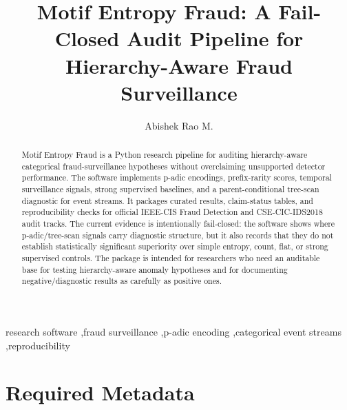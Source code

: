 \documentclass[preprint,12pt,a4paper]{elsarticle}
\begin{document}
\renewcommand{\labelenumii}{\arabic{enumi}.\arabic{enumii}}
\begin{frontmatter}

\title{Motif Entropy Fraud: A Fail-Closed Audit Pipeline for Hierarchy-Aware Fraud Surveillance}

\author{Abishek Rao M.}
\address{RV College of Engineering, Bengaluru, India}

\begin{abstract}
Motif Entropy Fraud is a Python research pipeline for auditing hierarchy-aware categorical fraud-surveillance hypotheses without overclaiming unsupported detector performance. The software implements p-adic encodings, prefix-rarity scores, temporal surveillance signals, strong supervised baselines, and a parent-conditional tree-scan diagnostic for event streams. It packages curated results, claim-status tables, and reproducibility checks for official IEEE-CIS Fraud Detection and CSE-CIC-IDS2018 audit tracks. The current evidence is intentionally fail-closed: the software shows where p-adic/tree-scan signals carry diagnostic structure, but it also records that they do not establish statistically significant superiority over simple entropy, count, flat, or strong supervised controls. The package is intended for researchers who need an auditable base for testing hierarchy-aware anomaly hypotheses and for documenting negative/diagnostic results as carefully as positive ones.
\end{abstract}

\begin{keyword}
research software \sep fraud surveillance \sep p-adic encoding \sep categorical event streams \sep reproducibility
\end{keyword}

\end{frontmatter}

\section*{Required Metadata}
\end{document}
